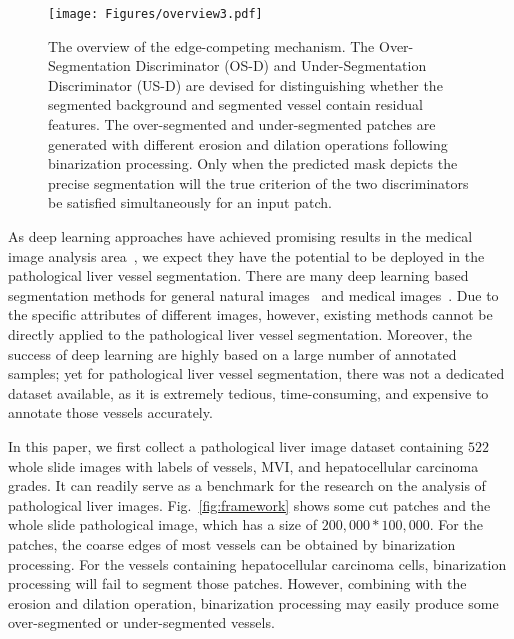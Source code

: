 \documentclass[letterpaper]{article} %
\begin{document}
\begin{figure}[!t]
\centering
\texttt{[image: Figures/overview3.pdf]}
\caption{The overview of the edge-competing mechanism.
The Over-Segmentation Discriminator (OS-D) and  Under-Segmentation Discriminator (US-D) are devised for distinguishing whether the segmented background and segmented vessel contain residual features.
The over-segmented and under-segmented patches are generated with different erosion and dilation operations following binarization processing.
Only when the predicted mask
depicts the precise segmentation
will the  true criterion
of the two discriminators
be satisfied
simultaneously for an input patch.}
\vspace{-1em}
\label{fig:overview}
\end{figure}


As deep learning approaches have achieved promising results in the medical image analysis area~\cite{ker2018deep,altaf2019going},
we expect they have the potential to
be deployed in the pathological liver vessel segmentation.
There are many deep learning based segmentation methods for general natural images~\cite{minaee2020image}
and medical images~\cite{ronneberger2015u-net:,xue2018segan:,Dai2019Transfer}.
Due to the specific attributes of different images, however,
existing methods cannot be directly applied to the
pathological liver vessel segmentation.
Moreover, the success of deep learning are highly based on a large number of annotated samples;
yet for pathological liver vessel segmentation,
there was not a dedicated dataset available,
as it is extremely  tedious, time-consuming, and expensive
to annotate those vessels accurately.

\iffalse
{The diagnosis of MVI includes two steps:
discovering the vessels that contain hepatocellular carcinoma cells,
and counting the cell number in each vessel.
When developing an algorithm for the automatic diagnosis of MVI,
the first and essential step is the accurate segmentation of vessels.}
\fi

In this paper, we first collect a pathological liver
image dataset containing $522$ whole slide images with
labels of vessels, MVI, and hepatocellular carcinoma grades.
It can readily serve as a benchmark for the research on the
analysis of pathological liver images.
Fig.~\ref{fig:framework} shows some cut patches and the whole
slide pathological image, which has a size of $200,000 * 100,000$.
For the patches, the coarse edges of most vessels can be obtained by binarization processing. For the vessels containing hepatocellular carcinoma cells, binarization processing will fail to segment those patches.
However, combining with the erosion and dilation operation, binarization processing may easily produce some over-segmented or under-segmented vessels.
\end{document}
